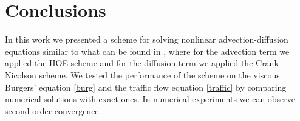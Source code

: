 \documentclass[../include.tex]{subfiles}
\begin{document}

\chapter{Conclusions}
In this work we presented a scheme for solving nonlinear advection-diffusion equations similar to what can be found in \cite{algoritmy}, where for the advection term we applied the IIOE scheme and for the diffusion term we applied the Crank-Nicolson scheme. We tested the performance of the scheme on the viscous Burgers' equation \eqref{burg} and the traffic flow equation \eqref{traffic} by comparing numerical solutions with exact ones. In numerical experiments we can observe second order convergence.
\end{document}
